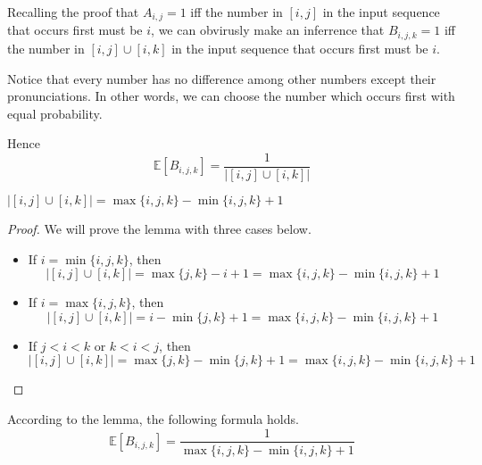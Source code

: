 Recalling the proof that $A_{i, j} = 1$ iff the number in $[i, j]$ in the input sequence that occurs first must be $i$, we can obvirusly make an inferrence that $B_{i, j, k} = 1$ iff the number in $[i, j] \cup [i, k]$ in the input sequence that occurs first must be $i$.

Notice that every number has no difference among other numbers except their pronunciations. In other words, we can choose the number which occurs first with equal probability.

Hence
\[\mathbb{E}[B_{i, j, k}] = \dfrac{1}{\left|[i, j] \cup [i, k]\right|}\]

\begin{lemma}
$\left|[i, j] \cup [i, k]\right| = \max\{i, j, k\} - \min\{i, j, k\} + 1$
\end{lemma}
\begin{proof}
We will prove the lemma with three cases below.
\begin{itemize}
\item If $i = \min\{i, j, k\}$, then
\[\left|[i, j] \cup [i, k]\right| = \max\{j, k\} - i + 1 = \max\{i, j, k\} - \min\{i, j, k\} + 1\]
\item If $i = \max\{i, j, k\}$, then
\[\left|[i, j] \cup [i, k]\right| = i - \min\{j, k\} + 1 = \max\{i, j, k\} - \min\{i, j, k\} + 1\]
\item If $j < i < k$ or $k < i < j$, then
\[\left|[i, j] \cup [i, k]\right| = \max\{j, k\} - \min\{j, k\} + 1 = \max\{i, j, k\} - \min\{i, j, k\} + 1\]
\end{itemize}
\end{proof}

According to the lemma, the following formula holds.
\[\mathbb{E}[B_{i, j, k}] = \dfrac{1}{\max\{i, j, k\} - \min\{i, j, k\} + 1}\]
